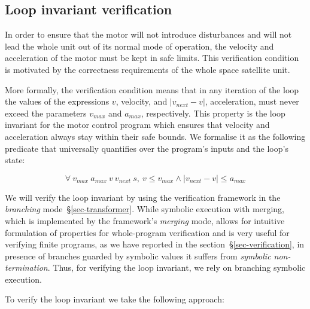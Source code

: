 \subsection{Loop invariant verification}

In order to ensure that the motor will not introduce disturbances
and will not lead the whole unit out of its normal mode of operation, the velocity and
acceleration of the motor must be kept in safe limits. This verification condition
is motivated by the correctness requirements of the whole space satellite unit.

More formally, the verification condition means
that in any iteration of the loop the values of the
expressions $v$, velocity, and $\left| v_{next} - v \right|$,
acceleration, must never exceed the parameters $v_{max}$ and $a_{max}$, respectively.
This property is the loop invariant for the motor control program which
ensures that velocity and acceleration always stay within their safe bounds. We
formalise it as the following predicate that universally quantifies over the
program's inputs and the loop's state:

\begin{tcolorbox}
\LARGE{
\[
  \forall\ v_{max}\ a_{max}\ v\ v_{next}\ s,
  \ v \leq v_{max} \land \left| v_{next} - v \right| \leq a_{max}
\]}
\end{tcolorbox}

\noindent
We will verify the loop invariant by using the verification framework in the
\emph{branching} mode~\S\ref{sec-transformer}. While symbolic execution with
merging, which is implemented by the framework's \emph{merging} mode, allows
for intuitive formulation of properties for whole-program verification and
is very useful for verifying finite programs, as we have
reported in the section~\S\ref{sec-verification}, in presence of branches guarded
by symbolic values it suffers from \emph{symbolic non-termination}.
Thus, for verifying the loop invariant, we rely on branching symbolic execution.

To verify the loop invariant we take the following approach:

